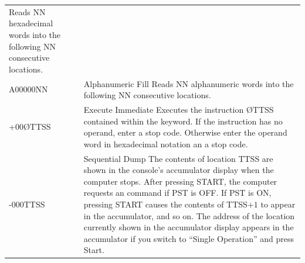 \begin{longtable}{l p{9.5cm}}
            Reads NN hexadecimal words into the following NN consecutive locations. \\
\addlinespace
A00000NN  & Alphanumeric Fill \newline
            Reads NN alphanumeric words into the following NN consecutive locations. \\
\addlinespace
+00ØTTSS  & Execute Immediate \newline
            Executes the instruction ØTTSS contained within the keyword. If the instruction has no operand, enter a stop code. Otherwise enter the operand word in hexadecimal notation an a stop code. \\
\addlinespace
-000TTSS  & Sequential Dump \newline
            The contents of location TTSS are shown in the console's accumulator display when the computer stops. After pressing START, the computer requests an command if PST is OFF. If PST is ON, pressing START causes the contents of TTSS$ + 1$ to appear in the accumulator, and so on. The address of the location currently shown in the accumulator display appears in the accumulator if you switch to ``Single Operation'' and press Start. \\
\end{longtable}

\newpage